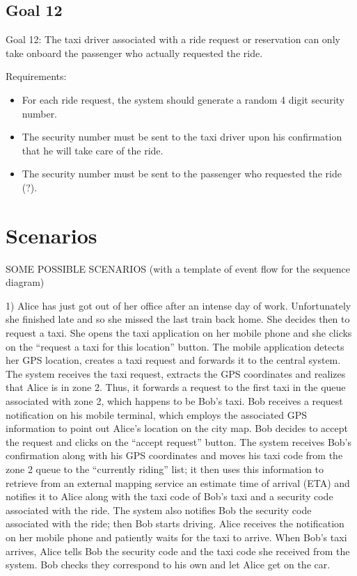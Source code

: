 \documentclass{book}
\begin{document}
\subsection{Goal 12}
Goal 12: The taxi driver associated with a ride request or reservation can only take onboard the passenger who actually requested the ride.

Requirements:
\begin{itemize}
\item For each ride request, the system should generate a random 4 digit security number.
\item The security number must be sent to the taxi driver upon his confirmation that he will take care of the ride.
\item The security number must be sent to the passenger who requested the ride (?).
\end{itemize}

\section{Scenarios}
SOME POSSIBLE SCENARIOS
(with a template of event flow for the sequence diagram)

1) Alice has just got out of her office after an intense day of work. Unfortunately she finished late and so she missed the last train back home. 
She decides then to request a taxi. She opens the taxi application on her mobile phone and she clicks on the “request a taxi for this location” button. 
The mobile application detects her GPS location, creates a taxi request and forwards it to the central system. 
The system receives the taxi request, extracts the GPS coordinates and realizes that Alice is in zone 2. Thus, it forwards a request to the first taxi in the queue associated with zone 2, which happens to be Bob’s taxi.
Bob receives a request notification on his mobile terminal, which employs the associated GPS information to point out Alice’s location on the city map. Bob decides to accept the request and clicks on the “accept request” button. 
The system receives Bob’s confirmation along with his GPS coordinates and moves his taxi code from the zone 2 queue to the “currently riding” list; it then uses this information to retrieve from an external mapping service an estimate time of arrival (ETA) and notifies it to Alice along with the taxi code of Bob’s taxi and a security code associated with the ride. The system also notifies Bob the security code associated with the ride; then Bob starts driving.
Alice receives the notification on her mobile phone and patiently waits for the taxi to arrive.
When Bob’s taxi arrives, Alice tells Bob the security code and the taxi code she received from the system. Bob checks they correspond to his own and let Alice get on the car.
\end{document}
